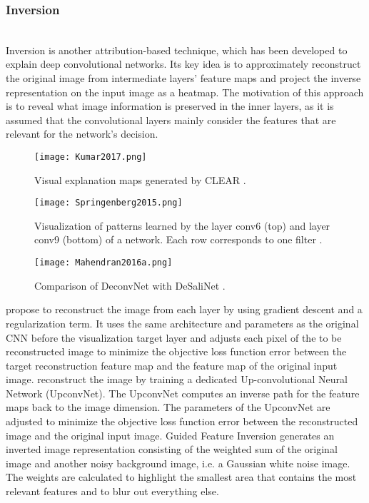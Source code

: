 \documentclass[journal]{IEEEtran}
\begin{document}
\subsubsection{Inversion}
\hfill\\
Inversion is another attribution-based technique, which has been developed to explain deep convolutional networks. Its key idea is to approximately reconstruct the original image from intermediate layers’ feature maps and project the inverse representation on the input image as a heatmap. The motivation of this approach is to reveal what image information is preserved in the inner layers, as it is assumed that the convolutional layers mainly consider the features that are relevant for the network’s decision. \cite{Vilone2020}

\begin{figure}
  \texttt{[image: Kumar2017.png]}
  \caption{Visual explanation maps generated by CLEAR \cite{Kumar2017}.}
\end{figure}

\begin{figure}
  \texttt{[image: Springenberg2015.png]}
  \caption{Visualization of patterns learned by the layer conv6 (top) and layer conv9 (bottom) of a network. Each row corresponds to one filter \cite{Springenberg2015}.}
\end{figure}

\begin{figure}
  \texttt{[image: Mahendran2016a.png]}
  \caption{Comparison of DeconvNet with DeSaliNet \cite{Mahendran2016a}.}
\end{figure}

\cite{Mahendran2015} \cite{Mahendran2016} propose to reconstruct the image from each layer by using gradient descent and a regularization term. It uses the same architecture and parameters as the original CNN before the visualization target layer and adjusts each pixel of the to be reconstructed image to minimize the objective loss function error between the target reconstruction feature map and the feature map of the original input image.
\cite{Dosovitskiy2016} \cite{Dosovitskiy2017} reconstruct the image by training a dedicated Up-convolutional Neural Network (UpconvNet). The UpconvNet computes an inverse path for the feature maps back to the image dimension. The parameters of the UpconvNet are adjusted to minimize the objective loss function error between the reconstructed image and the original input image.     
Guided Feature Inversion \cite{Du2018a} generates an inverted image representation consisting of the weighted sum of the original image and another noisy background image, i.e. a Gaussian white noise image. The weights are calculated to highlight the smallest area that contains the most relevant features and to blur out everything else. 
\end{document}
